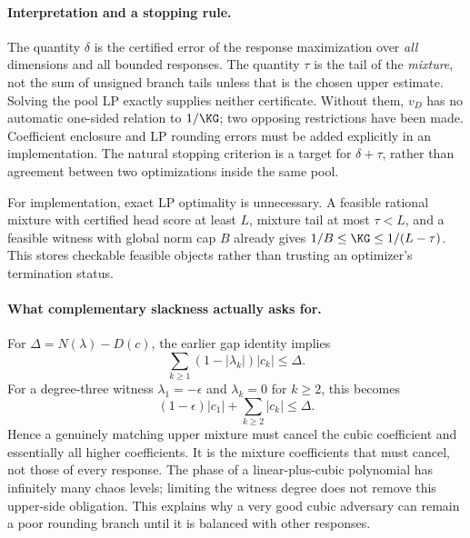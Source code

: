 \paragraph{Interpretation and a stopping rule.}
The quantity $\delta$ is the certified error of the response maximization
over \emph{all} dimensions and all bounded responses. The quantity
$\tau$ is the tail of the \emph{mixture}, not the sum of unsigned
branch tails unless that is the chosen upper estimate. Solving the
pool LP exactly supplies neither certificate. Without them, $v_D$
has no automatic one-sided relation to $1/\KG$; two opposing
restrictions have been made. Coefficient enclosure and LP rounding
errors must be added explicitly in an implementation.
The natural stopping criterion is a target for $\delta+\tau$, rather
than agreement between two optimizations inside the same pool.

For implementation, exact LP optimality is unnecessary. A feasible
rational mixture with certified head score at least $L$, mixture tail
at most $\tau<L$, and a feasible witness with global norm cap $B$
already gives $1/B\le\KG\le1/(L-\tau)$. This stores checkable
feasible objects rather than trusting an optimizer's termination status.

\paragraph{What complementary slackness actually asks for.}
For $\Delta=N(\lambda)-D(c)$, the earlier gap identity implies
\[
 \sum_{k\ge1}(1-|\lambda_k|)|c_k|\le\Delta.
\]
For a degree-three witness $\lambda_1=-\epsilon$ and
$\lambda_k=0$ for $k\ge2$, this becomes
\[
 (1-\epsilon)|c_1|+\sum_{k\ge2}|c_k|\le\Delta.
\]
Hence a genuinely matching upper mixture must cancel the cubic
coefficient and essentially all higher coefficients. It is the
mixture coefficients that must cancel, not those of every response.
The phase of a linear-plus-cubic polynomial has infinitely many chaos
levels; limiting the witness degree does not remove this upper-side
obligation. This explains why a very good cubic adversary can remain
a poor rounding branch until it is balanced with other responses.

